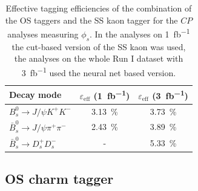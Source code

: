 \documentclass{PoS}
\begin{document}
\small \begin{table}[htbp]
  \centering
  \begin{tabular}{lcc}
  \toprule
	Decay mode & $\varepsilon_\text{eff}$ (\SI{1}{fb^{-1}}) & $\varepsilon_\text{eff}$ (\SI{3}{fb^{-1}}) \\
  \midrule
	$B_s^0\to J\!/\!\psi K^+K^-$ & \SI{3.13}{\%} \cite{3} & \SI{3.73}{\%} \cite{4} \\ 
	$\bar{B}_s^0\to J\!/\!\psi \pi^+\pi^-$ & \SI{2.43}{\%} \cite{5} & \SI{3.89}{\%} \cite{6} \\
	$\bar{B}_s^0\to D_s^+D_s^-$ & - & \SI{5.33}{\%} \cite{7} \\
  \bottomrule
  \end{tabular}
 \small{ \caption{Effective tagging efficiencies of the combination of the OS taggers and the SS kaon tagger for the $C\!P$ analyses measuring $\phi_s$. In the analyses on \SI{1}{fb^{-1}} the cut-based version of the SS kaon was used, the analyses on the whole Run I dataset with \SI{3}{fb^{-1}} used the neural net based version. }}
  \label{tab:phis}
\end{table} 
\normalsize
\subsection{OS charm tagger}
\end{document}
